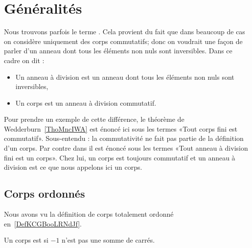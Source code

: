
\section{Généralités}

\begin{normaltext}      \label{NORMooGPWRooIKJqqw}
	Nous trouvons parfois le terme . Cela provient du fait que dans beaucoup de cas on considère uniquement des corps commutatifs; donc on voudrait une façon de parler d'un anneau dont tous les éléments non nuls sont inversibles. Dans ce cadre on dit :
	\begin{itemize}
		\item Un anneau à division est un anneau dont tous les éléments non nuls sont inversibles,
		\item Un corps est un anneau à division commutatif.
	\end{itemize}
	Pour prendre un exemple de cette différence, le théorème de Wedderburn~\ref{ThoMncIWA} est énoncé ici sous les termes «Tout corps fini est commutatif». Sous-entendu : la commutativité ne fait pas partie de la définition d'un corps. Par contre dans \cite{KXjFWKA} il est énoncé sous les termes «Tout anneau à division fini est un corps». Chez lui, un corps est toujours commutatif et un anneau à division est ce que nous appelons ici un corps.
\end{normaltext}

\subsection{Corps ordonnés}

Nous avons vu la définition de corps totalement ordonné en~\ref{DefKCGBooLRNdJf}.

\begin{definition}
	Un corps est  si \( -1\) n'est pas une somme de carrés.
\end{definition}

